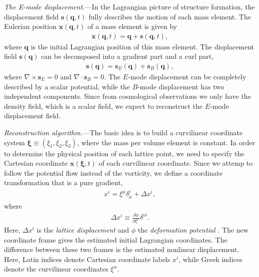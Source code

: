 \documentclass[aps,prl,twocolumn,showpacs,superscriptaddress,groupedaddress,nofootinbib]{revtex4}  %
\newcommand{\bea}{\begin{eqnarray}}
\newcommand{\eea}{\end{eqnarray}}
\begin{document}
{\it The E-mode displacement.}---In the Lagrangian picture of structure 
formation, 
the displacement field $\bm{s}(\bm{q},t)$ fully describes the motion of each mass element. The Eulerian position $\bm{x}(\bm{q},t)$ of a mass element is given by
\bea
\bm{x}(\bm{q},t)=\bm{q}+\bm{s}(\bm{q},t),
\eea
where $\bm{q}$ is the initial Lagrangian position of this mass element.
The displacement field $\bm{s}(\bm{q})$ can be decomposed into a gradient part
and a curl part,
\bea
\bm{s}(\bm{q})=\bm{s}_E(\bm{q})+\bm{s}_B(\bm{q}),
\eea
where $\nabla\times\bm{s}_E=0$ and $\nabla\cdot\bm{s}_B=0$.
The $E$-mode displacement can be completely described by a scalar potential,
while the $B$-mode displacement has two independent components.
Since from cosmological observations we only have the density field,
which is a scalar field, we expect 
to reconstruct the $E$-mode displacement field.


{\it Reconstruction algorithm.}---The basic idea is to build a curvilinear 
coordinate system $\bm{\xi}\equiv(\xi_1,\xi_2,\xi_3)$, where the mass per
volume element is constant. 
In order to determine the physical position of each lattice point, we need to 
specify the Cartesian coordinate $\bm{x}(\bm{\xi},t)$ of each curvilinear 
coordinate.
Since we attemp to follow the potential flow instead of the vorticity, we 
define a coordinate transformation that is a pure gradient,
\bea
\label{eq:trs}
x^i=\xi^\mu\delta^i_\mu+\Delta x^i,
\eea
where
\bea
\Delta x^i\equiv\frac{\partial\phi}{\partial\xi^\nu}\delta^{i\nu}.
\eea
Here, $\Delta{x}^i$ is the {\it lattice displacement} and $\phi$ the 
{\it deformation potential} \cite{1995ApJS..100..269P,1998ApJS..115...19P}. 
The new coordinate frame gives the estimated initial Lagrangian coordinates. 
The difference between these two frames is the estimated nonlinear displacement.
Here, Latin indices denote Cartesian coordinate labels $x^i$, while Greek 
indices denote the curvilinear coordinates $\xi^\alpha$.
\end{document}
